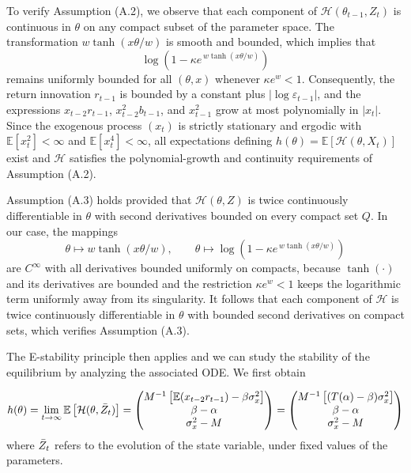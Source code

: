 \documentclass[11pt]{article}
\begin{document}
To verify Assumption (A.2), we observe that each component of $\mathcal{H}(\theta_{t-1},Z_t)$ is continuous in $\theta$ on any compact subset of the parameter space. The transformation $w\tanh(x\theta/w)$ is smooth and bounded, which implies that
\[
\log\!\left(1-\kappa e^{\,w\tanh(x\theta/w)}\right)
\]
remains uniformly bounded for all $(\theta,x)$ whenever $\kappa e^{w}<1$. Consequently, the return innovation $r_{t-1}$ is bounded by a constant plus $|\log\varepsilon_{t-1}|$, and the expressions $x_{t-2}r_{t-1}$, $x_{t-2}^2 b_{t-1}$, and $x_{t-1}^2$ grow at most polynomially in $|x_t|$. Since the exogenous process $(x_t)$ is strictly stationary and ergodic with $\mathbb{E}[x_t^2]<\infty$ and $\mathbb{E}[x_t^4]<\infty$, all expectations defining $h(\theta)=\mathbb{E}[\mathcal{H}(\theta,X_t)]$ exist and $\mathcal{H}$ satisfies the polynomial-growth and continuity requirements of Assumption (A.2).

Assumption (A.3) holds provided that $\mathcal{H}(\theta,Z)$ is twice continuously differentiable in $\theta$ with second derivatives bounded on every compact set $Q$. In our case, the mappings
\[
\theta \mapsto w\tanh(x\theta/w), \qquad 
\theta \mapsto \log\!\left(1-\kappa e^{\,w\tanh(x\theta/w)}\right)
\]
are $C^\infty$ with all derivatives bounded uniformly on compacts, because $\tanh(\cdot)$ and its derivatives are bounded and the restriction $\kappa e^{w}<1$ keeps the logarithmic term uniformly away from its singularity. It follows that each component of $\mathcal{H}$ is twice continuously differentiable in $\theta$ with bounded second derivatives on compact sets, which verifies Assumption (A.3).

The E-stability principle then applies and we can study the stability of the equilibrium by analyzing the associated ODE.
We first obtain 

\begin{equation}
    \begin{aligned}
        h(\theta) = \lim_{t \to \infty} \mathbb{E} \left[\mathcal{H}(\theta, \Bar{Z}_t)\right] = \begin{pmatrix}
        M^{-1} \left[ \mathbb{E}(x_{t-2} r_{t-1}) - \beta \sigma^2_x \right] \\
        \beta - \alpha \\
        \sigma^2_x - M
    \end{pmatrix} =
    \begin{pmatrix}
        M^{-1}\left[(T(\alpha) - \beta) \sigma^2_x\right] \\
        \beta - \alpha \\
        \sigma^2_x - M
    \end{pmatrix}
    \\
    \end{aligned}
\end{equation}
where $\Bar{Z}_t$ refers to the evolution of the state variable, under fixed values of the parameters.
\end{document}
